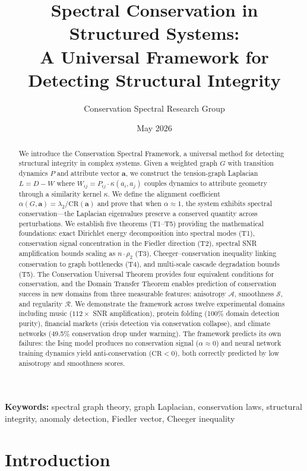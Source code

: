 \documentclass[12pt,letterpaper]{article}
\title{\LARGE\bfseries Spectral Conservation in Structured Systems:\\[4pt] \large A Universal Framework for Detecting Structural Integrity}
\author{
  Conservation Spectral Research Group
}
\date{May 2026}
\newcommand{\bfa}{\mathbf{a}}
\newcommand{\CR}{\mathrm{CR}}
\newcommand{\cA}{\mathcal{A}}
\newcommand{\cS}{\mathcal{S}}
\newcommand{\cR}{\mathcal{R}}
\begin{document}
\maketitle

\begin{abstract}
We introduce the Conservation Spectral Framework, a universal method for detecting structural integrity in complex systems. Given a weighted graph $G$ with transition dynamics $P$ and attribute vector $\bfa$, we construct the tension-graph Laplacian $L = D - W$ where $W_{ij} = P_{ij} \cdot \kappa(a_i, a_j)$ couples dynamics to attribute geometry through a similarity kernel $\kappa$. We define the alignment coefficient $\alpha(G,\bfa) = \lambda_2 / \CR(\bfa)$ and prove that when $\alpha \approx 1$, the system exhibits spectral conservation---the Laplacian eigenvalues preserve a conserved quantity across perturbations. We establish five theorems (T1--T5) providing the mathematical foundations: exact Dirichlet energy decomposition into spectral modes (T1), conservation signal concentration in the Fiedler direction (T2), spectral SNR amplification bounds scaling as $n \cdot \rho_2$ (T3), Cheeger--conservation inequality linking conservation to graph bottlenecks (T4), and multi-scale cascade degradation bounds (T5). The Conservation Universal Theorem provides four equivalent conditions for conservation, and the Domain Transfer Theorem enables prediction of conservation success in new domains from three measurable features: anisotropy $\cA$, smoothness $\cS$, and regularity $\cR$. We demonstrate the framework across twelve experimental domains including music ($112\times$ SNR amplification), protein folding (100\% domain detection purity), financial markets (crisis detection via conservation collapse), and climate networks (49.5\% conservation drop under warming). The framework predicts its own failures: the Ising model produces no conservation signal ($\alpha \approx 0$) and neural network training dynamics yield anti-conservation ($\CR < 0$), both correctly predicted by low anisotropy and smoothness scores.
\end{abstract}

\medskip
\noindent\textbf{Keywords:} spectral graph theory, graph Laplacian, conservation laws, structural integrity, anomaly detection, Fiedler vector, Cheeger inequality

\newpage
\tableofcontents
\newpage

\section{Introduction}
\label{sec:intro}
\end{document}
